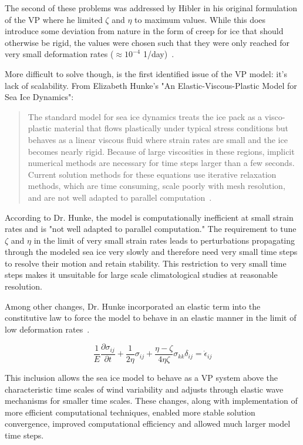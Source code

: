 The second of these problems was addressed by Hibler in his original formulation of the \ac{VP} where he limited $\zeta$ and $\eta$ to maximum values.  While this does introduce some deviation from nature in the form of creep for ice that should otherwise be rigid, the values were chosen such that they were only reached for very small deformation rates ($\approx10^{-4}$ 1/day)~\citet{Hibler1979}.

More difficult to solve though, is the first identified issue of the \ac{VP} model: it's lack of scalability.  From Elizabeth Hunke's "An Elastic-Viscous-Plastic Model for Sea Ice Dynamics":
\begin{quotation}
The standard model for sea ice dynamics treats the ice pack as a visco-plastic material that flows plastically under typical stress conditions but behaves as a linear viscous fluid where strain rates are small and the ice becomes nearly rigid.  Because of large viscosities in these regions, implicit numerical methods are necessary for time steps larger than a few seconds.  Current solution methods for these equations use iterative relaxation methods, which are time consuming, scale poorly with mesh resolution, and are not well adapted to parallel computation~\citet{Hunke1997}.
\end{quotation}

According to Dr. Hunke, the model is computationally inefficient at small strain rates and is "not well adapted to parallel computation."  The requirement to tune $\zeta$ and $\eta$ in the limit of very small strain rates leads to perturbations propagating through the modeled sea ice very slowly and therefore need very small time steps to resolve their motion and retain stability.  This restriction to very small time steps makes it unsuitable for large scale climatological studies at reasonable resolution.

Among other changes, Dr. Hunke incorporated an elastic term into the constitutive law to force the model to behave in an elastic manner in the limit of low deformation rates~\citet{Hunke1997}.

\begin{equation}
\frac{1}{E}\frac{\partial \sigma_{ij}}{\partial t} + \frac{1}{2\eta}\sigma_{ij}+\frac{\eta-\zeta}{4\eta\zeta}\sigma_{kk}\delta_{ij} = \dot{\epsilon}_{ij}
\label{eq:Hunke_Constitutive}
\end{equation}

This inclusion allows the sea ice model to behave as a \ac{VP} system above the characteristic time scales of wind variability and adjusts through elastic wave mechanisms for smaller time scales.  These changes, along with implementation of more efficient computational techniques, enabled more stable solution convergence, improved computational efficiency and allowed much larger model time steps.

